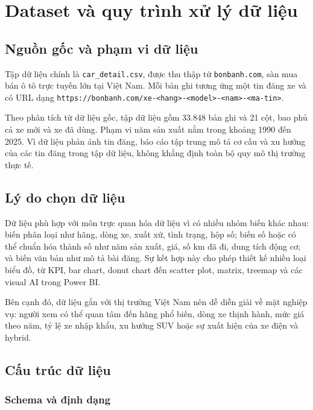 \section{Dataset và quy trình xử lý dữ liệu}\label{sec:dataset}

\subsection{Nguồn gốc và phạm vi dữ liệu}

Tập dữ liệu chính là \texttt{car\_detail.csv}, được thu thập từ \texttt{bonbanh.com}, sàn mua bán ô tô trực tuyến lớn tại Việt Nam. Mỗi bản ghi tương ứng một tin đăng xe và có URL dạng \texttt{https://bonbanh.com/xe-<hang>-<model>-<nam>-<ma-tin>}.

Theo phân tích từ dữ liệu gốc, tập dữ liệu gồm 33.848 bản ghi và 21 cột, bao phủ cả xe mới và xe đã dùng. Phạm vi năm sản xuất nằm trong khoảng 1990 đến 2025. Vì dữ liệu phản ánh tin đăng, báo cáo tập trung mô tả cơ cấu và xu hướng của các tin đăng trong tập dữ liệu, không khẳng định toàn bộ quy mô thị trường thực tế.

\subsection{Lý do chọn dữ liệu}

Dữ liệu phù hợp với môn trực quan hóa dữ liệu vì có nhiều nhóm biến khác nhau: biến phân loại như hãng, dòng xe, xuất xứ, tình trạng, hộp số; biến số hoặc có thể chuẩn hóa thành số như năm sản xuất, giá, số km đã đi, dung tích động cơ; và biến văn bản như mô tả bài đăng. Sự kết hợp này cho phép thiết kế nhiều loại biểu đồ, từ KPI, bar chart, donut chart đến scatter plot, matrix, treemap và các visual AI trong Power BI.

Bên cạnh đó, dữ liệu gắn với thị trường Việt Nam nên dễ diễn giải về mặt nghiệp vụ: người xem có thể quan tâm đến hãng phổ biến, dòng xe thịnh hành, mức giá theo năm, tỷ lệ xe nhập khẩu, xu hướng SUV hoặc sự xuất hiện của xe điện và hybrid.

\subsection{Cấu trúc dữ liệu}

\subsubsection{Schema và định dạng}

